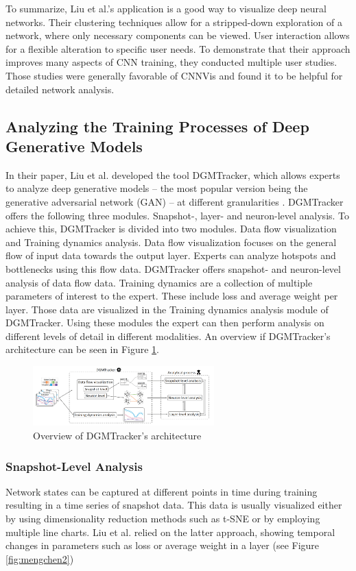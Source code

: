 \documentclass{acmsiggraph}               %
\begin{document}
To summarize, Liu et al.'s application is a good way to visualize deep neural networks. Their clustering techniques allow for a stripped-down exploration of a network, where only necessary components can be viewed. User interaction allows for a flexible alteration to specific user needs. To demonstrate that their approach improves many aspects of CNN training, they conducted multiple user studies. Those studies were generally favorable of CNNVis and found it to be helpful for detailed network analysis.

\subsection{Analyzing the Training Processes of Deep Generative Models}
In their paper, Liu et al. developed the tool DGMTracker, which allows experts to analyze deep generative models -- the most popular version being the generative adversarial network (GAN) -- at different granularities \cite{Liu2018}. 
DGMTracker offers the following three modules. Snapshot-, layer- and neuron-level analysis.
To achieve this, DGMTracker is divided into two modules. Data flow visualization and Training dynamics analysis.
Data flow visualization focuses on the general flow of input data towards the output layer. Experts can analyze hotspots and bottlenecks using this flow data. DGMTracker offers snapshot- and neuron-level analysis of data flow data.
Training dynamics are a collection of multiple parameters of interest to the expert. These include loss and average weight per layer. Those data are visualized in the Training dynamics analysis module of DGMTracker.
Using these modules the expert can then perform analysis on different levels of detail in different modalities.
An overview if DGMTracker's architecture can be seen in Figure \ref{fig:mengchen1}.

\begin{figure}[!htb]
  \centering
  \includegraphics[width=2.75in]{mengchen1}
  \caption{Overview of DGMTracker's architecture \protect\cite{Liu2018}}
  \label{fig:mengchen1}
\end{figure}

\subsubsection{Snapshot-Level Analysis}
Network states can be captured at different points in time during training resulting in a time series of snapshot data.
This data is usually visualized either by using dimensionality reduction methods such as t-SNE or by employing multiple line charts. 
Liu et al. relied on the latter approach, showing temporal changes in parameters such as loss or average weight in a layer (see Figure \ref{fig:mengchen2})
\end{document}
